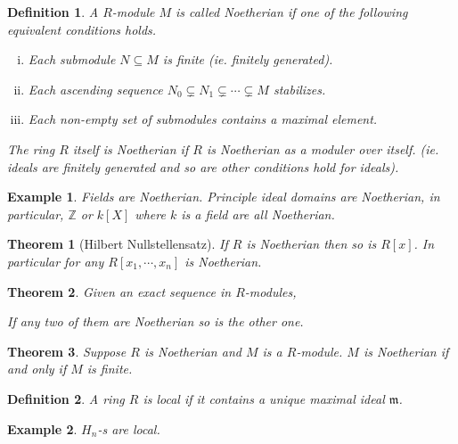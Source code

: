 \documentclass{article}
\newtheorem{theorem}{Theorem} [section]
\newtheorem{definition}{Definition}[section]
\newtheorem{example}{Example}[section]
\newcommand{\Z}[0]{\mathbb{Z}}
\begin{document}
\begin{definition}
  A $R$-module $M$ is called Noetherian if one of the following equivalent conditions holds.
  \begin{enumerate}[i).]
    \item Each submodule $N\subseteq M$ is finite (ie. finitely generated).
    \item Each ascending sequence $N_0\subsetneq N_1 \subsetneq \cdots \subsetneq M$ stabilizes.
    \item Each non-empty set of submodules contains a maximal element.
  \end{enumerate}
  The ring $R$ itself is Noetherian if $R$ is Noetherian as a moduler over itself. (ie. ideals are finitely generated and so are other conditions hold for ideals).
\end{definition}

\begin{example}
  Fields are Noetherian. Principle ideal domains are Noetherian, in particular, $\Z$ or $k[X]$ where $k$ is a field are all Noetherian.
\end{example}

\begin{theorem}[Hilbert Nullstellensatz]
  If $R$ is Noetherian then so is $R[x]$. In particular for any $R[x_1,\cdots,x_n]$ is Noetherian.
\end{theorem}

\begin{theorem}
  Given an exact sequence in $R$-modules,
  \begin{center}
  \end{center}
  If any two of them are Noetherian so is the other one.
\end{theorem}

\begin{theorem}
  Suppose $R$ is Noetherian and $M$ is a $R$-module. $M$ is Noetherian if and only if $M$ is finite.
\end{theorem}

\begin{definition}
  A ring $R$ is local if it contains a unique maximal ideal $\mathfrak{m}$.
\end{definition}

\begin{example}
  $H_n$-s are local.
\end{example}
\end{document}
